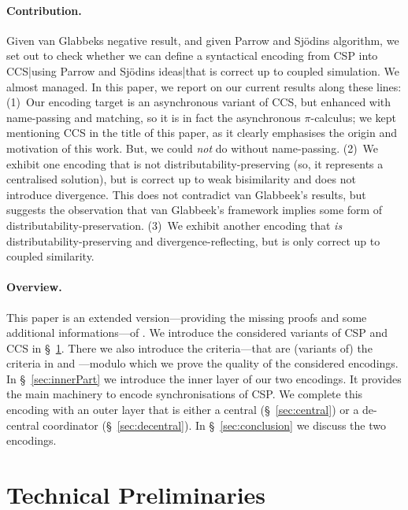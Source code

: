 \documentclass[]{eptcs}
\begin{document}
\paragraph{Contribution.}
Given van Glabbeks negative result, and given Parrow and Sj\"odins algorithm, we set out to check whether we can define a syntactical encoding from CSP into CCS|using Parrow and Sj\"odins ideas|that is correct up to coupled simulation. We almost managed. In this paper, we report on our current results along these lines: 
(1)~Our encoding target is an asynchronous variant of CCS, but enhanced with name-passing and matching, so it is in fact the asynchronous $\pi$-calculus; we kept mentioning CCS in the title of this paper, as it clearly emphasises the origin and motivation of this work. But, we could \emph{not} do without name-passing.
(2)~We exhibit one encoding that is not distributability-preserving (so, it represents a centralised solution), but is correct up to weak bisimilarity and does not introduce divergence. This does not contradict van Glabbeek's results, but suggests the observation that van Glabbeek's framework implies some form of distributability-preservation.
(3)~We exhibit another encoding that \emph{is} distributability-preserving and divergence-reflecting, but is only correct up to coupled similarity.

\paragraph{Overview.}
This paper is an extended version---providing the missing proofs and some additional in\-for\-ma\-tions---of \cite{hatzel15}.
We introduce the considered variants of CSP and CCS in \S~\ref{sec:techPrel}. There we also introduce the criteria---that are (variants of) the criteria in \cite{gorla10} and \cite{petersNestmannGoltz13}---modulo which we prove the quality of the considered encodings. In \S~\ref{sec:innerPart} we introduce the inner layer of our two encodings. It provides the main machinery to encode synchronisations of CSP. We complete this encoding with an outer layer that is either a central (\S~\ref{sec:central}) or a de-central coordinator (\S~\ref{sec:decentral}). In \S~\ref{sec:conclusion} we discuss the two encodings.



\section{Technical Preliminaries}
\label{sec:techPrel}
\end{document}
